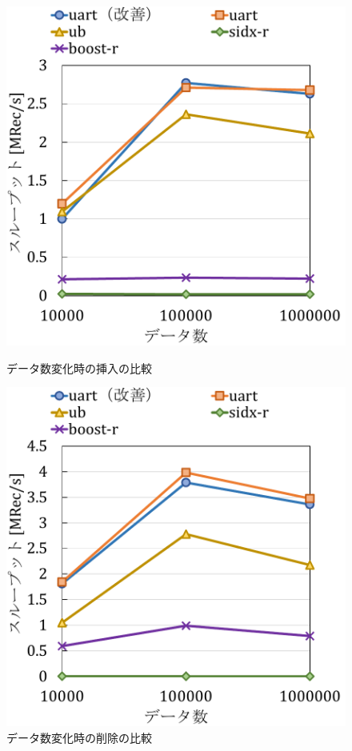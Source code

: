 \begin{figure}[tb]
  \begin{minipage}[c]{0.495\textwidth}
    \centering
    \includegraphics[scale=0.5]{./figures/graph-datasize-insert.pdf}
    \caption{データ数変化時の挿入の比較}
    \label{graph:grouped}
  \end{minipage}
  \begin{minipage}[c]{0.495\textwidth}
    \centering
    \includegraphics[scale=0.5]{./figures/graph-datasize-delete.pdf}
    \caption{データ数変化時の削除の比較}
    \label{graph:paired}
  \end{minipage}
\end{figure}

